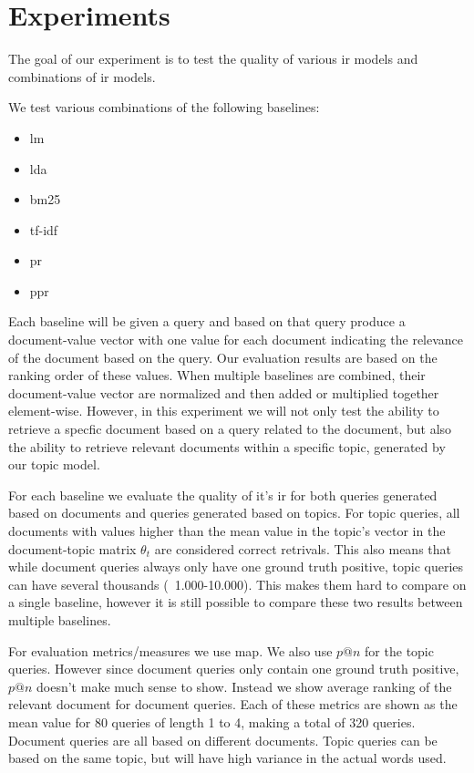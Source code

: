 \section{Experiments}\label{sec:experiment}

The goal of our experiment is to test the quality of various \gls{ir} models and combinations of \gls{ir} models.

We test various combinations of the following baselines:
\begin{itemize}
	\item \gls{lm}
	\item \gls{lda}
	\item \gls{bm25}
	\item \gls{tf-idf}
	\item \gls{pr}
	\item \gls{ppr}
\end{itemize}

Each baseline will be given a query and based on that query produce a document-value vector with one value for each document indicating the relevance of the document based on the query.
Our evaluation results are based on the ranking order of these values.
When multiple baselines are combined, their document-value vector are normalized and then added or multiplied together element-wise.
However, in this experiment we will not only test the ability to retrieve a specfic document based on a query related to the document, but also the ability to retrieve relevant documents within a specific topic, generated by our topic model.

For each baseline we evaluate the quality of it's \gls{ir} for both queries generated based on documents and queries generated based on topics.
For topic queries, all documents with values higher than the mean value in the topic's vector in the document-topic matrix $\theta_t$ are considered correct retrivals.
This also means that while document queries always only have one ground truth positive, topic queries can have several thousands (~1.000-10.000).
This makes them hard to compare on a single baseline, however it is still possible to compare these two results between multiple baselines.

For evaluation metrics/measures we use \gls{map}. We also use $p @ n$ for the topic queries. However since document queries only contain one ground truth positive, $p @ n$ doesn't make much sense to show. Instead we show average ranking of the relevant document for document queries.
Each of these metrics are shown as the mean value for 80 queries of length 1 to 4, making a total of 320 queries.
Document queries are all based on different documents. Topic queries can be based on the same topic, but will have high variance in the actual words used.

